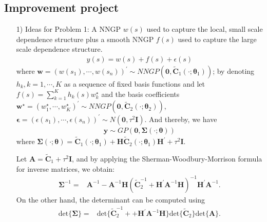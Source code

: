 \documentclass[
12pt, %
a4paper, %
oneside, %
headinclude,footinclude, %
BCOR5mm, %
]{scrartcl}
\begin{document}
\subsection{Improvement project}
\begin{itemize}
 \item [1)] Ideas for Problem 1: A NNGP $w(s)$ used to capture the \textcolor[rgb]{0.50,0.50,0.50}{local, small scale dependence structure} plus a smooth NNGP $f(s)$ used to capture the \textcolor[rgb]{0.50,0.50,0.50}{large scale dependence structure}.
\begin{equation}
\begin{aligned}
y(s) = w(s) + f(s) + \epsilon(s)
\end{aligned} \label{DP1}
\end{equation}
where $\boldsymbol{w} = \left(w(s_1), \cdots, w(s_n)\right)^\prime \sim NNGP\left(\boldsymbol{0}, \boldsymbol{\tilde{C}}_1(\cdot; \boldsymbol{\theta}_1)\right)$; by denoting $h_{k}, k = 1, \cdots, K$ as a sequence of fixed basis functions and
let $f(s) = \sum_{k = 1}^{K}h_{k}(s)w_{k}^{\star}$ and the basis coefficients $\boldsymbol{w}^{\star} = \left(w_1^{\star}, \cdots, w_K^{\star}\right)^\prime \sim NNGP\left(\boldsymbol{0}, \boldsymbol{\tilde{C}}_2(\cdot; \boldsymbol{\theta}_2)\right)$,
$\boldsymbol{\epsilon} = \left(\epsilon(s_1), \cdots, \epsilon(s_n)\right)^\prime \sim N(\boldsymbol{0}, \tau^2\boldsymbol{I})$. And thereby, we have
\begin{equation}
\begin{aligned}
\boldsymbol{y} \sim GP\left(\boldsymbol{0}, \boldsymbol{\Sigma}(\cdot; \boldsymbol{\theta})\right)
\end{aligned} \label{DP1}
\end{equation}
where $\boldsymbol{\Sigma}(\cdot; \boldsymbol{\theta}) = \boldsymbol{\tilde{C}}_1(\cdot; \boldsymbol{\theta}_1) +
\boldsymbol{H}\boldsymbol{\tilde{C}}_2(\cdot; \boldsymbol{\theta}_1)\boldsymbol{H}^\prime + \tau^2\boldsymbol{I}.$

Let $\boldsymbol{A} = \boldsymbol{\tilde{C}}_1 + \tau^2\boldsymbol{I}$, and by applying the Sherman-Woodbury-Morrison formula for inverse matrices, we obtain:
\begin{equation}
\begin{aligned}
  \boldsymbol{\Sigma}^{-1} = & \boldsymbol{A}^{-1} - \boldsymbol{A}^{-1}\boldsymbol{H} 
  \left(\boldsymbol{\tilde{C}}_2^{-1} + \boldsymbol{H}^\prime\boldsymbol{A}^{-1}\boldsymbol{H}\right)^{-1}\boldsymbol{H}^\prime\boldsymbol{A}^{-1}.
\end{aligned}
\end{equation}
On the other hand, the determinant can be computed using
\begin{equation}
\begin{aligned}
  \text{det}\{\boldsymbol{\Sigma}\} = &  \text{det}\{\boldsymbol{\tilde{C}}_2^{-1} + + \boldsymbol{H}^\prime\boldsymbol{A}^{-1}\boldsymbol{H}\}\text{det}\{\boldsymbol{\tilde{C}}_2\}\text{det}\{\boldsymbol{A}\}.
\end{aligned}
\end{equation}


\end{itemize}
\end{document}

